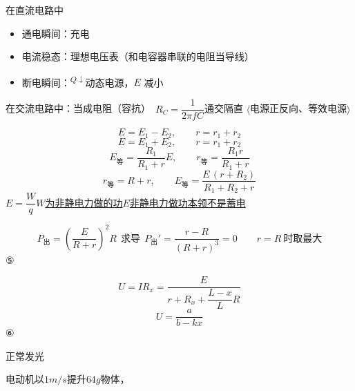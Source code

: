 \noindent 在直流电路中
\begin{itemize}
\item 通电瞬间：充电
\item 电流稳态：理想电压表（和电容器串联的电阻当导线）
\item 断电瞬间：\textsuperscript{$Q\downarrow$}动态电源，$E$ 减小
\end{itemize}

\noindent 在交流电路中：当成电阻（容抗）\ $R_C=\dfrac{1}{2\pi fC}$\quad 通交隔直
$\langle$电源正反向、等效电源$\rangle$

\[ E=E_1-E_2,\qquad r=r_1+r_2 \]
\[ E=E_1+E_2,\qquad r=r_1+r_2 \]
\[ E_{\text{等}}=\frac{R_1}{R_1+r}E,\qquad r_{\text{等}}=\frac{R_1r}{R_1+r} \]
\[ r_{\text{等}}=R+r,\qquad E_{\text{等}}=\frac{E\,(r+R_2)}{R_1+R_2+r} \] %
$E=\dfrac{W}{q}$\quad \underline{$W$为非静电力做的功}\quad \underline{$E$非静电力做功本领}\quad \underline{不是蓄电}

\[
P_{\text{出}}=\left(\frac{E}{R+r}\right)^{2}R\ \ \text{求导}\ \ P_{\text{出}}'=\frac{r-R}{(R+r)^{3}}=0\qquad r=R\ \text{时取最大}
\]
⑤

\[ U=IR_x=\frac{E}{r+R_x+\dfrac{L-x}{L}R} \]
\[ U=\frac{a}{b-kx} \]
⑥

正常发光

电动机以$1\unit{m/s}$提升$64\unit{g}$物体，

